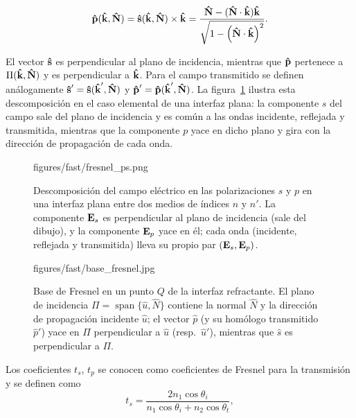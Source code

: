 \begin{equation}
  \bm{\hat{\mathbf{p}}}(\bm{\hat{\mathbf{k}}},\bm{\hat{\mathbf{N}}})
  = \bm{\hat{\mathbf{s}}}(\bm{\hat{\mathbf{k}}},\bm{\hat{\mathbf{N}}})\times\bm{\hat{\mathbf{k}}}
  = \frac{\bm{\hat{\mathbf{N}}}-(\bm{\hat{\mathbf{N}}}\cdot\bm{\hat{\mathbf{k}}})\bm{\hat{\mathbf{k}}}}
  {\sqrt{1-\left(\bm{\hat{\mathbf{N}}}\cdot\bm{\hat{\mathbf{k}}}\right)^2}}.
\label{eq:pdef}
\end{equation}

El vector $\bm{\hat{\mathbf{s}}}$ es perpendicular al plano de incidencia, mientras que $\bm{\hat{\mathbf{p}}}$ pertenece a $\Pi(\bm{\hat{\mathbf{k}}},\bm{\hat{\mathbf{N}}})$ y es perpendicular a $\bm{\hat{\mathbf{k}}}$. Para el campo transmitido se definen análogamente $\bm{\hat{\mathbf{s}}}'=\bm{\hat{\mathbf{s}}}(\bm{\hat{\mathbf{k}}}',\bm{\hat{\mathbf{N}}})$ y $\bm{\hat{\mathbf{p}}}'=\bm{\hat{\mathbf{p}}}(\bm{\hat{\mathbf{k}}}',\bm{\hat{\mathbf{N}}})$. La figura~\ref{fig:fresnel_sp_interface} ilustra esta descomposición en el caso elemental de una interfaz plana: la componente $s$ del campo sale del plano de incidencia y es común a las ondas incidente, reflejada y transmitida, mientras que la componente $p$ yace en dicho plano y gira con la dirección de propagación de cada onda.

\begin{figure}[!htbp]
  \centering
    {figures/fast/fresnel_ps.png}
  \caption{Descomposición del campo eléctrico en las polarizaciones $s$ y $p$ en una interfaz plana entre dos medios de índices $n$ y $n'$. La componente $\vb E_s$ es perpendicular al plano de incidencia (sale del dibujo), y la componente $\vb E_p$ yace en él; cada onda (incidente, reflejada y transmitida) lleva su propio par $(\vb E_s, \vb E_p)$.}
  \label{fig:fresnel_sp_interface}
\end{figure}

\begin{figure}[!htbp]
  \centering
    {figures/fast/base_fresnel.jpg}
  \caption{Base de Fresnel en un punto $Q$ de la interfaz refractante. El plano de incidencia $\Pi = \operatorname{span}\{\hat{u}, \hat{N}\}$ contiene la normal $\hat{N}$ y la dirección de propagación incidente $\hat{u}$; el vector $\hat{p}$ (y su homólogo transmitido $\hat{p}'$) yace en $\Pi$ perpendicular a $\hat{u}$ (resp.\ $\hat{u}'$), mientras que $\hat{s}$ es perpendicular a $\Pi$.}
  \label{fig:fresnel_basis}
\end{figure}

Los coeficientes $t_s$, $t_p$ se conocen como coeficientes de Fresnel para la transmisión \cite{bornwolf1999} y se definen como
\begin{equation}
  t_s =
  \frac{2 n_1 \cos\theta_i}
  {n_1\cos\theta_i+n_2\cos\theta_t},
  \label{eq:ts}
\end{equation}

